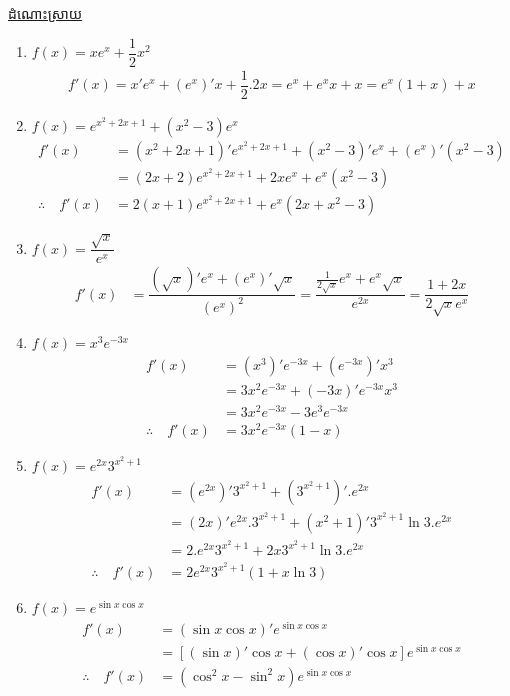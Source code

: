 \documentclass[12pt,fleqn]{book} %
\newcommand{\answer}{\begin{center}
\kml \color{blue} \underline{ដំណោះស្រាយ}
\end{center}}
\begin{document}
\answer 
\begin{enumerate}
\item $f(x)=xe^x +\dfrac{1}{2}x^2$
\begin{align*}
f'(x)=x' e^x +(e^x)'x+\dfrac{1}{2}.2x=e^x+e^xx +x=e^x(1+x)+x
\end{align*}
\item $f(x)=e^{x^2+2x+1}+(x^2-3)e^x$
\begin{align*}
f'(x)&=(x^2+2x+1)'e^{x^2+2x+1}+(x^2-3)'e^x+(e^x)'(x^2-3)\\
&=(2x+2)e^{x^2+2x+1}+2xe^x+e^x(x^2-3)\\
\therefore \quad f'(x)&=2(x+1)e^{x^2+2x+1}+e^x(2x+x^2-3)
\end{align*}
\item $f(x)=\dfrac{\sqrt{x}}{e^x}$
\begin{align*}
f'(x)&=\dfrac{(\sqrt{x})'e^x+(e^x)' \sqrt{x}}{(e^x)^2}=\dfrac{\frac{1}{2\sqrt{x}}e^x+e^x\sqrt{x}}{e^{2x}}=\dfrac{1+2x}{2\sqrt{x}e^x}
\end{align*}
\item $f(x)=x^3 e^{-3x}$
\begin{align*}
f'(x)&=(x^3)'e^{-3x}+(e^{-3x})'x^3\\
&=3x^2 e^{-3x}+(-3x)'e^{-3x}x^3\\
&=3x^2e^{-3x}-3e^3e^{-3x}\\
\therefore \quad f'(x)&=3x^2e^{-3x}(1-x)
\end{align*}
\item $f(x)=e^{2x}3^{x^2+1}$
\begin{align*}
f'(x)&=(e^{2x})'3^{x^2+1}+(3^{x^2+1})'.e^{2x}\\
&=(2x)'e^{2x}.3^{x^2+1}+(x^2+1)'3^{x^2+1}\ln 3 . e^{2x}\\
&=2.e^{2x}3^{x^2+1}+2x3^{x^2+1}\ln 3. e^{2x}\\
\therefore \quad f'(x)&=2e^{2x}3^{x^2+1}(1+x\ln 3)
\end{align*}
\item $f(x)=e^{\sin x\cos x}$
\begin{align*}
f'(x)&=(\sin x\cos x)'e^{\sin x\cos x}\\
&=[(\sin x)'\cos x+(\cos x)'\cos x]e^{\sin x\cos x}\\
\therefore \quad f'(x)&=(\cos^2 x-\sin^2 x)e^{\sin x\cos x}
\end{align*}
\end{enumerate}
\end{document}
